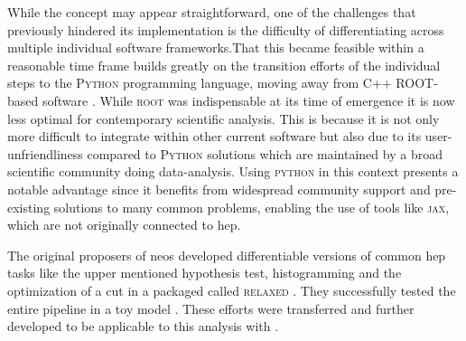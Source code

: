 While the concept may appear straightforward, one of the challenges that previously hindered its implementation is the difficulty of differentiating across multiple individual software frameworks.That this became feasible within a reasonable time frame builds greatly on the transition efforts  of the individual steps to the \textsc{Python} programming language, moving away from C++ \textsc{ROOT}-based software \citep{ANTCHEVA20092499}. While \textsc{root} was indispensable at its time of emergence it is now less optimal for contemporary scientific analysis. This is because it is not only more difficult to integrate within other current software but also due to its user-unfriendliness compared to \textsc{Python} solutions which are maintained by a broad scientific community doing data-analysis. Using \textsc{python} in this context presents a notable advantage since it benefits from widespread community support and pre-existing solutions to many common problems, enabling the use of tools like \textsc{jax}, which are not originally connected to \ac{hep}.

The original proposers \citet{Simpson_2023} of \ac{neos} developed differentiable versions of common \ac{hep} tasks like the upper mentioned hypothesis test, histogramming and the optimization of a cut in a packaged called \textsc{relaxed} \citep{Simpson_relaxed_version_0_3_0_2023}. They successfully tested the entire pipeline in a toy model \citep{Simpson_neos_version_0_2_0_2021}. These efforts were transferred and further developed to be applicable to this analysis with \citep{hh_neos}.



